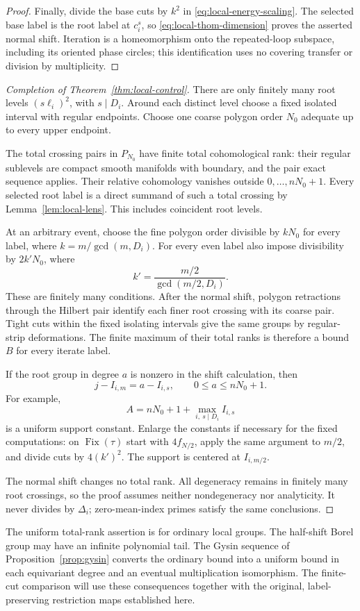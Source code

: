 \begin{proof}
Finally, divide the base cuts by \(k^2\) in
\eqref{eq:local-energy-scaling}.  The selected base
label is the root label at \(c_i^s\), so
\eqref{eq:local-thom-dimension} proves the asserted
normal shift.
Iteration is a homeomorphism onto the repeated-loop subspace,
including its oriented phase circles; this identification uses
no covering transfer or division by multiplicity.
\end{proof}

\begin{proof}[Completion of Theorem~\ref{thm:local-control}]
There are only finitely many root levels
\((s\ell_i)^2\), with \(s\mid D_i\).  Around each distinct
level choose a fixed isolated interval with regular
endpoints.  Choose one coarse polygon order \(N_0\)
adequate up to every upper endpoint.

The total crossing pairs in \(P_{N_0}\) have finite
total cohomological rank: their regular sublevels are
compact smooth manifolds with boundary, and the pair
exact sequence applies.  Their relative cohomology
vanishes outside \(0,\ldots,nN_0+1\).
Every selected root label is a direct summand of
such a total crossing by Lemma~\ref{lem:local-lens}.
This includes coincident root levels.

At an arbitrary event, choose the fine polygon order
divisible by \(kN_0\) for every label, where
\(k=m/\gcd(m,D_i)\).  For every even label also impose
divisibility by \(2k'N_0\), where
\[
 k'=\frac{m/2}{\gcd(m/2,D_i)}.
\]
These are finitely many conditions.  After the
normal shift, polygon retractions through the Hilbert
pair identify each finer root crossing with its coarse
pair.  Tight cuts within the fixed isolating intervals
give the same groups by regular-strip deformations.
The finite maximum of their total ranks is therefore
a bound \(B\) for every iterate label.

If the root group in degree \(a\) is nonzero in the
shift calculation, then
\[
 j-I_{i,m}=a-I_{i,s},\qquad 0\le a\le nN_0+1.
\]
For example,
\[
 A=nN_0+1+\max_{i,\ s\mid D_i}I_{i,s}
\]
is a uniform support constant.  Enlarge the constants
if necessary for the fixed computations: on
\(\operatorname{Fix}(\tau)\) start with \(4f_{N/2}\),
apply the same argument to \(m/2\), and divide cuts
by \(4(k')^2\).  The support is centered at
\(I_{i,m/2}\).

The normal shift changes no total rank.  All
degeneracy remains in finitely many root crossings,
so the proof assumes neither nondegeneracy nor
analyticity.  It never divides by \(\Delta_i\);
zero-mean-index primes satisfy the same conclusions.
\end{proof}

The uniform total-rank assertion is for ordinary
local groups.  The half-shift Borel group may have
an infinite polynomial tail.  The Gysin sequence
of Proposition~\ref{prop:gysin} converts the ordinary
bound into a uniform bound in each equivariant
degree and an eventual multiplication isomorphism.
The finite-cut comparison will use these consequences
together with the original, label-preserving
restriction maps established here.
